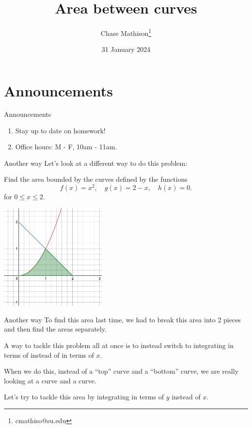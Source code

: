 \documentclass[presentation]{beamer}
\institute[SU]{Shenandoah University}
\author{Chase Mathison\thanks{cmathiso@su.edu}}
\date{31 January 2024}
\title{Area between curves}
\begin{document}
\maketitle

\section{Announcements}
\label{sec:org35c771a}
\begin{frame}[label={sec:org51b92f0}]{Announcements}
\begin{enumerate}
\item Stay up to date on homework!
\item Office hours: M - F, 10am - 11am.
\end{enumerate}
\end{frame}

\begin{frame}[label={sec:org8484c41}]{Another way}
Let's look at a different way to do this problem:

Find the area bounded by the curves defined by the functions
\[ f \left( x \right) = x^2, \quad g \left( x \right) = 2-x, \quad h
\left( x \right) = 0. \]
for \(0 \le x \le 2.\)

\begin{center}
\includegraphics[width=0.4\textwidth]{../img/day005-ex1.png}
\end{center}
\end{frame}

\begin{frame}[label={sec:orge76f691}]{Another way}
To find this area last time, we had to break this area into 2 pieces
and then find the areas separately.

A way to tackle this problem all at once is to instead switch to
integrating in terms of \uline{\hspace*{1in}} instead of in terms of \(x\).

When we do this, instead of a ``top'' curve and a ``bottom'' curve, we are
really looking at a \uline{\hspace*{1in}} curve and a \uline{\hspace*{1in}} curve.

Let's try to tackle this area by integrating in terms of \(y\)
instead of \(x\).
\end{frame}
\end{document}
